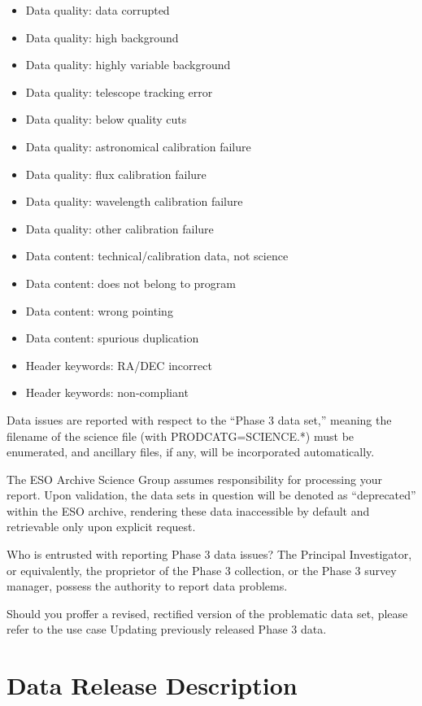 \documentclass[a4paper,10pt]{book}
\begin{document}
\begin{itemize}
    \item Data quality: data corrupted
    \item Data quality: high background
    \item Data quality: highly variable background
    \item Data quality: telescope tracking error
    \item Data quality: below quality cuts
    \item Data quality: astronomical calibration failure
    \item Data quality: flux calibration failure
    \item Data quality: wavelength calibration failure
    \item Data quality: other calibration failure
    \item Data content: technical/calibration data, not science
    \item Data content: does not belong to program
    \item Data content: wrong pointing
    \item Data content: spurious duplication
    \item Header keywords: RA/DEC incorrect
    \item Header keywords: non-compliant
\end{itemize}

Data issues are reported with respect to the “Phase 3 data set,” meaning the filename of the science file (with PRODCATG=SCIENCE.*) must be enumerated, and ancillary files, if any, will be incorporated automatically.

The ESO Archive Science Group assumes responsibility for processing your report. Upon validation, the data sets in question will be denoted as “deprecated” within the ESO archive, rendering these data inaccessible by default and retrievable only upon explicit request.

Who is entrusted with reporting Phase 3 data issues? The Principal Investigator, or equivalently, the proprietor of the Phase 3 collection, or the Phase 3 survey manager, possess the authority to report data problems.

Should you proffer a revised, rectified version of the problematic data set, please refer to the use case Updating previously released Phase 3 data.


\chapter{Data Release Description}
\end{document}
